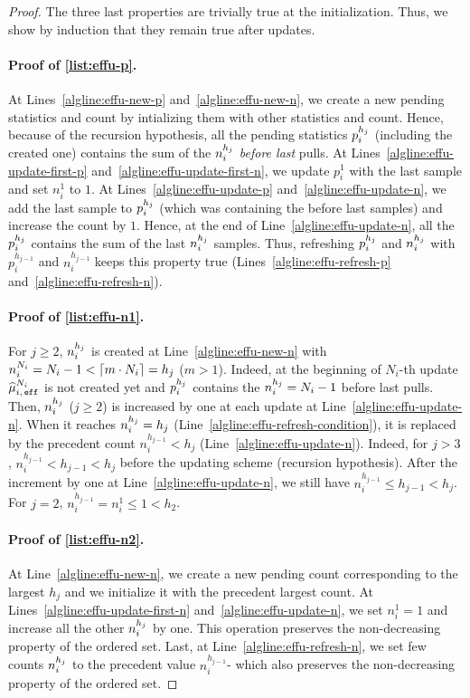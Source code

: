 \begin{proof}
The three last properties are trivially true at the initialization. Thus, we show by induction that they remain true after updates.
\paragraph{Proof of \ref{list:effu-p}. } At Lines~\ref{algline:effu-new-p} and~\ref{algline:effu-new-n}, we create a new pending statistics and count by intializing them with other statistics and count. Hence, because of the recursion hypothesis, all the pending statistics $p_i^{h_j}$ (including the created one) contains the sum of the $n_i^{h_j}$ \emph{before last} pulls. At Lines~\ref{algline:effu-update-first-p} and~\ref{algline:effu-update-first-n}, we update $p_i^1$ with the last sample and set $n_i^1$ to $1$. At Lines~\ref{algline:effu-update-p} and~\ref{algline:effu-update-n}, we add the last sample to $p_i^{h_j}$ (which was containing the before last samples) and increase the count by $1$. Hence, at the end of Line~\ref{algline:effu-update-n}, all the $p_i^{h_j}$ contains the sum of the last $n_i^{h_j}$ samples. Thus, refreshing $p_i^{h_j}$ and $n_i^{h_j}$ with $ p_i^{h_{j-1}}$ and $n_i^{h_{j-1}}$ keeps this property true (Lines~\ref{algline:effu-refresh-p} and~\ref{algline:effu-refresh-n}). 

\paragraph{Proof of \ref{list:effu-n1}.}

For $j\geq2$, $n_i^{h_j}$ is created at Line~\ref{algline:effu-new-n} with $n_i^{N_i} = N_i -1 < \left\lceil m \cdot N_i\right\rceil = h_j$ ($m>1$). Indeed, at the beginning of $N_i$-th update $\widehat{\mu}_{i,\, \texttt{eff}}^{N_i}$ is not created yet and $p_i^{h_j}$ contains the $n_i^{h_j} = N_i-1$ before last pulls. Then, $n_i^{h_j}$ ($j\geq2$) is increased by one at each update at Line~\ref{algline:effu-update-n}. When it reaches $n_i^{h_j} = h_j$ (Line~\ref{algline:effu-refresh-condition}), it is replaced by the precedent count $n_i^{h_{j-1}}<h_j$ (Line~\ref{algline:effu-update-n}). Indeed, for $j>3$, $n_i^{h_{j-1}} < h_{j-1} < h_j$ before the updating scheme (recursion hypothesis). After the increment by one at Line~\ref{algline:effu-update-n}, we still have $n_i^{h_{j-1}} \leq h_{j-1} < h_j$. For $j=2$, $n_i^{h_{j-1}} = n_i^1 \leq 1 < h_2$.

\paragraph{Proof of \ref{list:effu-n2}.}
At Line~\ref{algline:effu-new-n}, we create a new pending count corresponding to the largest $h_j$ and we initialize it with the precedent largest count. At Lines~\ref{algline:effu-update-first-n} and~\ref{algline:effu-update-n}, we set $n_i^1 =1$ and increase all the other $n_i^{h_j}$ by one. This operation preserves the non-decreasing property of the ordered set. Last, at Line~\ref{algline:effu-refresh-n}, we set few counts $n_i^{h_j}$ to the precedent value $n_i^{h_{j-1}}$- which also preserves the non-decreasing property of the ordered set. 


\end{proof}
